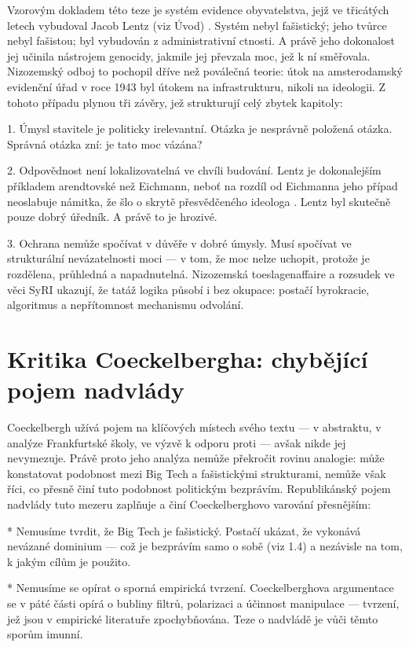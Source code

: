 Vzorovým dokladem této teze je systém evidence obyvatelstva, jejž ve třicátých letech vybudoval Jacob Lentz (viz Úvod) \parencite{SeltzerAnderson01}.
Systém nebyl fašistický; jeho tvůrce nebyl fašistou; byl vybudován z administrativní ctnosti.
A právě jeho dokonalost jej učinila nástrojem genocidy, jakmile jej převzala moc, jež k ní směřovala.
Nizozemský odboj to pochopil dříve než poválečná teorie: útok na amsterodamský evidenční úřad v roce 1943 byl útokem na infrastrukturu, nikoli na ideologii.
Z tohoto případu plynou tři závěry, jež strukturují celý zbytek kapitoly:


1. Úmysl stavitele je politicky irelevantní. Otázka  je nesprávně položená otázka.
Správná otázka zní: je tato moc vázána?


2. Odpovědnost není lokalizovatelná ve chvíli budování.
Lentz je dokonalejším příkladem arendtovské  než Eichmann, neboť na rozdíl od Eichmanna jeho případ neoslabuje námitka, že šlo o skrytě přesvědčeného ideologa \parencite[srov.][]{Stangneth14}.
Lentz byl skutečně pouze dobrý úředník.
A právě to je hrozivé.


3. Ochrana nemůže spočívat v důvěře v dobré úmysly. Musí spočívat ve strukturální nevázatelnosti moci — v tom, že moc nelze uchopit, protože je rozdělena, průhledná a napadnutelná.
Nizozemská toeslagenaffaire a rozsudek ve věci SyRI \parencite{RechtbankSyRI20} ukazují, že tatáž logika působí i bez okupace: postačí byrokracie, algoritmus a nepřítomnost mechanismu odvolání.
\section{Kritika Coeckelbergha: chybějící pojem nadvlády}
Coeckelbergh užívá pojem  na klíčových místech svého textu — v abstraktu, v analýze Frankfurtské školy, ve výzvě k odporu proti  — avšak nikde jej nevymezuje.
Právě proto jeho analýza nemůže překročit rovinu analogie: může konstatovat podobnost mezi Big Tech a fašistickými strukturami, nemůže však říci, co přesně činí tuto podobnost politickým bezprávím.
Republikánský pojem nadvlády tuto mezeru zaplňuje a činí Coeckelberghovo varování přesnějším:


* Nemusíme tvrdit, že Big Tech je fašistický. Postačí ukázat, že vykonává nevázané dominium — což je bezprávím samo o sobě (viz 1.4) a nezávisle na tom, k jakým cílům je použito.


* Nemusíme se opírat o sporná empirická tvrzení. Coeckelberghova argumentace se v páté části opírá o bubliny filtrů, polarizaci a účinnost manipulace — tvrzení, jež jsou v empirické literatuře zpochybňována.
Teze o nadvládě je vůči těmto sporům imunní.


